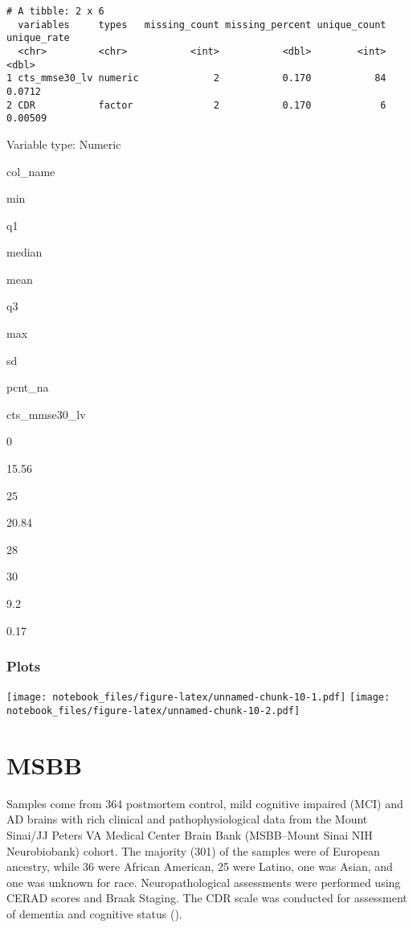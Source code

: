 \documentclass[]{book}
\begin{document}
\begin{verbatim}
# A tibble: 2 x 6
  variables     types   missing_count missing_percent unique_count unique_rate
  <chr>         <chr>           <int>           <dbl>        <int>       <dbl>
1 cts_mmse30_lv numeric             2           0.170           84     0.0712 
2 CDR           factor              2           0.170            6     0.00509
\end{verbatim}

\label{tab:rosmap-cog-numeric}Variable type: Numeric

col\_name

min

q1

median

mean

q3

max

sd

pcnt\_na

cts\_mmse30\_lv

0

15.56

25

20.84

28

30

9.2

0.17

\hypertarget{htmlwidget-b4007d8949fefc4d49ed}{}

\hypertarget{plots-5}{%
\subsection{Plots}\label{plots-5}}

\texttt{[image: notebook\_files/figure-latex/unnamed-chunk-10-1.pdf]} \texttt{[image: notebook\_files/figure-latex/unnamed-chunk-10-2.pdf]}

\hypertarget{msbb}{%
\chapter{MSBB}\label{msbb}}

Samples come from 364 postmortem control, mild cognitive impaired (MCI) and AD brains with rich clinical and pathophysiological data from the Mount Sinai/JJ Peters VA Medical Center Brain Bank (MSBB--Mount Sinai NIH Neurobiobank) cohort. The majority (301) of the samples were of European ancestry, while 36 were African American, 25 were Latino, one was Asian, and one was unknown for race. Neuropathological assessments were performed using CERAD scores and Braak Staging. The CDR scale was conducted for assessment of dementia and cognitive status (\citet{10.1038/sdata.2018.185}).
\end{document}
